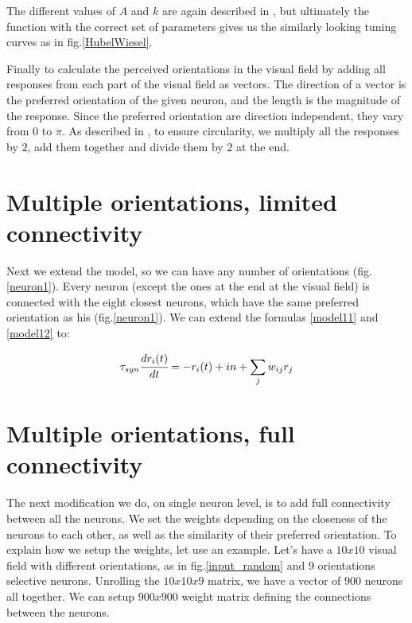 

The different values of $A$ and $k$ are again described in \cite{keemink2015unified}, but ultimately the function with the correct set of parameters gives us the similarly looking tuning curves as in fig.\ref{HubelWiesel}.

Finally to calculate the perceived orientations in the visual field by adding all responses from each part of the visual field as vectors. The direction of a vector is the preferred orientation of the given neuron, and the length is the magnitude of the response. Since the preferred orientation are direction independent, they vary from $0$ to $\pi$. As described in \cite{keemink2015unified}, to ensure circularity, we multiply all the responses by $2$, add them together and divide them by $2$ at the end.




\section{Multiple orientations, limited connectivity}

Next we extend the model, so we can have any number of orientations (fig.\ref{neuron1}). Every neuron (except the ones at the end at the visual field) is connected with the eight closest neurons, which have the same preferred orientation as his (fig.\ref{neuron1}). We can extend the formulas \ref{model11} and \ref{model12} to:

\begin{equation}
\tau_{syn}\cfrac{dr_{i}(t)}{dt}=-r_{i}(t)+in+\sum_{j} w_{ij}r_{j}
\end{equation}

 

\section{Multiple orientations, full connectivity} \label{mult_model}
The next modification we do, on single neuron level, is to add full connectivity between all the neurons. We set the weights depending on the closeness of the neurons to each other, as well as the similarity of their preferred orientation. To explain how we setup the weights, let use an example. Let's have a $10x10$ visual field with different orientations, as in fig.\ref{input_random} and $9$ orientations selective neurons. Unrolling the $10x10x9$ matrix, we have a vector of $900$ neurons all together. We can setup $900x900$ weight matrix defining the connections between the neurons. 


